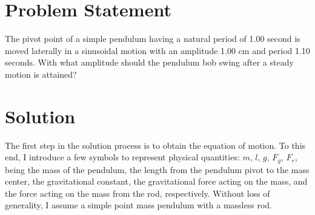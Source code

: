 \documentclass[letter, 11pt]{article}
\begin{document}
\pagestyle{empty}

\section*{Problem Statement}
The pivot point of a simple pendulum having a natural period of 1.00 second is
moved laterally in a sinusoidal motion with an amplitude 1.00 cm and period
1.10 seconds. With what amplitude should the pendulum bob swing after a steady
motion is attained?

\section*{Solution}
The first step in the solution process is to obtain the equation of motion. To
this end, I introduce a few symbols to represent physical quantities: $m$, $l$,
$g$, $F_g$, $F_r$, being the mass of the pendulum, the length from the pendulum
pivot to the mass center, the gravitational constant, the gravitational force
acting on the mass, and the force acting on the mass from the rod,
respectively. Without loss of generality, I assume a simple point mass pendulum
with a massless rod.
\end{document}
